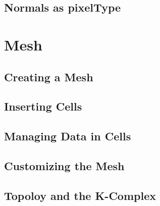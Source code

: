 


\subsection{Normals as pixelType}
\label{sec:PointSetWithCovariantVectorsAsPixelType}






\section{Mesh}\label{MeshSection}

\subsection{Creating a Mesh}
\label{sec:CreatingAMesh}




\subsection{Inserting Cells}
\label{sec:InsertingCellsInMesh}




\subsection{Managing Data in Cells}
\label{sec:ManagingCellDataInMesh}




\subsection{Customizing the Mesh}
\label{sec:CustomizingTheMesh}




\subsection{Topoloy and the K-Complex}
\label{sec:MeshKComplex}




